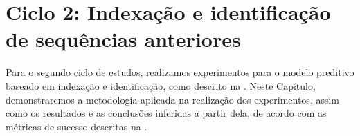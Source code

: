 \chapter{Ciclo 2: Indexação e identificação de sequências anteriores}
\label{chap:dtw}

Para o segundo ciclo de estudos, realizamos experimentos para o modelo preditivo baseado em indexação e identificação, como descrito na . Neste Capítulo, demonstraremos a metodologia aplicada na realização dos experimentos, assim como os resultados e as conclusões inferidas a partir dela, de acordo com as métricas de sucesso descritas na .